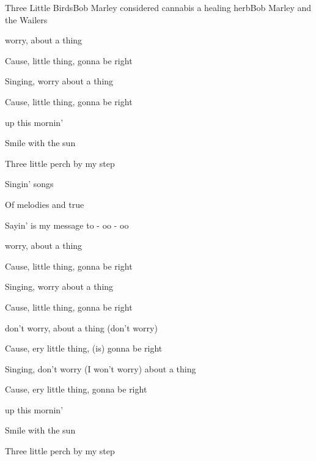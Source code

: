 \begin{SBSong}{Three Little Birds}{Bob Marley considered cannabis a healing herb}{Bob Marley and the Wailers}
  \begin{SBChorus}
    worry, about a thing

   Cause,  little thing, gonna be right

   Singing,  worry about a thing

   Cause,  little thing, gonna be right
  \end{SBChorus}
  \begin{SBVerse}
    up this mornin'

   Smile with the  sun

   Three little  perch by my step

   Singin'  songs

   Of melodies  and true

   Sayin'  is my message to  - oo - oo
  \end{SBVerse}
  \begin{SBChorus} 
    worry, about a thing

   Cause,  little thing, gonna be right

   Singing,  worry about a thing

   Cause,  little thing, gonna be right
  \end{SBChorus}
  \begin{SBChorus}
   
    don't worry, about a thing (don't worry)

   Cause, ery little thing, (is) gonna be right

   Singing, don't worry (I won't worry) about a thing

   Cause, ery little thing, gonna be right
  \end{SBChorus}
  \CBPageBrk
  \begin{SBVerse}
    up this mornin'

   Smile with the  sun

   Three little  perch by my step


\end{SBVerse}
\end{SBSong}
